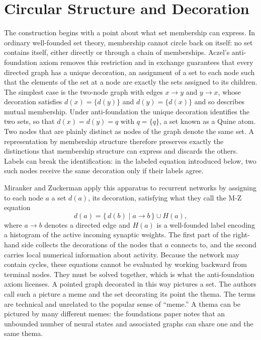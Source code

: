 \documentclass[11pt, a4paper]{article}
\theoremstyle{plain}
\theoremstyle{definition}
\theoremstyle{remark}
\begin{document}
\newpage

\section{Circular Structure and Decoration}

The construction begins with a point about what set membership can express. In ordinary well-founded set theory, membership cannot circle back on itself: no set contains itself, either directly or through a chain of memberships. Aczel's anti-foundation axiom \cite{aczel1988} removes this restriction and in exchange guarantees that every directed graph has a unique decoration, an assignment of a set to each node such that the elements of the set at a node are exactly the sets assigned to its children. The simplest case is the two-node graph with edges $x \to y$ and $y \to x$, whose decoration satisfies $d(x) = \{d(y)\}$ and $d(y) = \{d(x)\}$ and so describes mutual membership. Under anti-foundation the unique decoration identifies the two sets, so that $d(x) = d(y) = q$ with $q = \{q\}$, a set known as a Quine atom. Two nodes that are plainly distinct as nodes of the graph denote the same set. A representation by membership structure therefore preserves exactly the distinctions that membership structure can express and discards the others. Labels can break the identification: in the labeled equation introduced below, two such nodes receive the same decoration only if their labels agree.

Miranker and Zuckerman \cite{mz2009,mz2010} apply this apparatus to recurrent networks by assigning to each node $a$ a set $d(a)$, its decoration, satisfying what they call the M-Z equation
\[
d(a) = \{\, d(b) \mid a \to b \,\} \cup H(a),
\]
where $a \to b$ denotes a directed edge and $H(a)$ is a well-founded label encoding a histogram of the active incoming synaptic weights. The first part of the right-hand side collects the decorations of the nodes that $a$ connects to, and the second carries local numerical information about activity. Because the network may contain cycles, these equations cannot be evaluated by working backward from terminal nodes. They must be solved together, which is what the anti-foundation axiom licenses. A pointed graph decorated in this way pictures a set. The authors call such a picture a meme and the set decorating its point the thema. The terms are technical and unrelated to the popular sense of ``meme.'' A thema can be pictured by many different memes: the foundations paper notes that an unbounded number of neural states and associated graphs can share one and the same thema.
\end{document}
